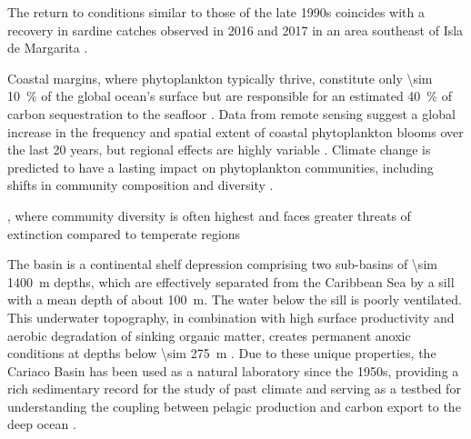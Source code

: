 The return to conditions similar to those of the late 1990s coincides with a recovery in sardine catches observed in 2016 and 2017 in an area southeast of Isla de Margarita \cite{gomez_gaspar_variacion_2025}. 




Coastal margins, where phytoplankton typically thrive, constitute only \qty{\sim 10}{\%} of the global ocean's surface but are responsible for an estimated \qty{40}{\%} of carbon sequestration to the seafloor \cite{yool_examination_2001, mullerkarger_importance_2005}. Data from remote sensing suggest a global increase in the frequency and spatial extent of coastal phytoplankton blooms over the last 20 years, but regional effects are highly variable \cite{dai_coastal_2023}. Climate change is predicted to have a lasting impact on phytoplankton communities, including shifts in community composition and diversity \cite{acevedo-trejos_glimpse_2014, boyd_biological_2016, henson_future_2021}.


, where community diversity is often highest \cite{brown_why_2014, righetti_global_2019} and faces greater threats of extinction compared to temperate regions \cite{finnegan_paleontological_2015}


The basin is a continental shelf depression comprising two sub-basins of \qty{\sim 1400}{m} depths, which are effectively separated from the Caribbean Sea by a sill with a mean depth of about \qty{100}{m}. The water below the sill is poorly ventilated. This underwater topography, in combination with high surface productivity and aerobic degradation of sinking organic matter, creates permanent anoxic conditions at depths below \qty{\sim 275}{m} \cite{thunell_organic_2000}. Due to these unique properties, the Cariaco Basin has been used as a natural laboratory since the 1950s, providing a rich sedimentary record for the study of past climate \cite{hughen1996nature} and serving as a testbed for understanding the coupling between pelagic production and carbon export to the deep ocean \cite{montes_vertical_2012}. %


    

